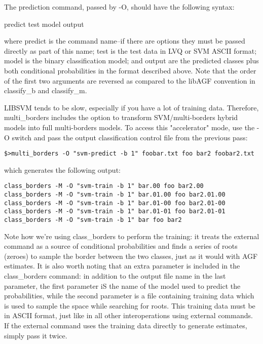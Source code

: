\documentclass[12pt]{article}
\begin{document}
The prediction command, passed by -O, should have the following syntax:

  predict test model output

where predict is the command name--if there are options they must be passed directly as part of this name; test is the test data in LVQ or SVM ASCII format; model is the binary classification model; and output are the predicted classes plus both conditional probabilities in the format described above.  Note that the order of the first two arguments are reversed as compared to the libAGF convention in classify_b and classify_m.

LIBSVM tends to be slow, especially if you have a lot of training data.  Therefore, multi_borders includes the option to transform SVM/multi-borders hybrid models into full multi-borders models.  To access this "accelerator" mode, use the -O switch and pass the output classification control file from the previous pass:

\begin{verbatim}
$>multi_borders -O "svm-predict -b 1" foobar.txt foo bar2 foobar2.txt
\end{verbatim}

which generates the following output:

\begin{verbatim}
class_borders -M -O "svm-train -b 1" bar.00 foo bar2.00
class_borders -M -O "svm-train -b 1" bar.01.00 foo bar2.01.00
class_borders -M -O "svm-train -b 1" bar.01-00 foo bar2.01-00
class_borders -M -O "svm-train -b 1" bar.01-01 foo bar2.01-01
class_borders -M -O "svm-train -b 1" bar foo bar2
\end{verbatim}

Note how we're using class_borders to perform the training: it treats the external command as a source of conditional probabilities and finds a series of roots (zeroes) to sample the border between the two classes, just as it would with AGF estimates.  It is also worth noting that an extra parameter is included in the class_borders command: in addition to the output file name in the last parameter, the first parameter iS the name of the model used to predict the probabilities, while the second parameter is a file containing training data which is used to sample the space while searching for roots.  This training data must be in ASCII format, just like in all other interoperations using external commands.  If the external command uses the training data directly to generate estimates, simply pass it twice.
\end{document}
